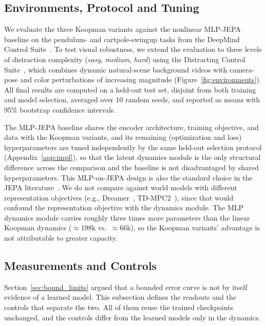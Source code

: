 \documentclass[10pt]{article} %
\begin{document}
\subsection{Environments, Protocol and Tuning}
\label{sec:protocol}
We evaluate the three Koopman variants against the nonlinear MLP-JEPA baseline on the pendulum- and cartpole-swingup tasks from the DeepMind Control Suite~\citep{Tassa2018}. To test visual robustness, we extend the evaluation to three levels of distraction complexity (\textit{easy}, \textit{medium}, \textit{hard}) using the Distracting Control Suite~\citep{Stone2021}, which combines dynamic natural-scene background videos with camera-pose and color perturbations of increasing magnitude (Figure~\ref{fig:environments}). All final results are computed on a held-out test set, disjoint from both training and model selection, averaged over 10 random seeds, and reported as means with 95\% bootstrap confidence intervals.

The MLP-JEPA baseline shares the encoder architecture, training objective, and data with the Koopman variants, and its remaining (optimization and loss) hyperparameters are tuned independently by the same held-out selection protocol (Appendix~\ref{app:impl}), so that the latent dynamics module is the only structural difference across the comparison and the baseline is not disadvantaged by shared hyperparameters. This MLP-on-JEPA design is also the standard choice in the JEPA literature~\citep{Bardes2024,zhou2025dinowmworldmodelspretrained}. We do not compare against world models with different representation objectives (e.g., Dreamer~\citep{Hafner2025}, TD-MPC2~\citep{Hansen2023}), since that would confound the representation objective with the dynamics module. The MLP dynamics module carries roughly three times more parameters than the linear Koopman dynamics ($\approx\!198$k vs.\ $\approx\!66$k), so the Koopman variants' advantage is not attributable to greater capacity.


\subsection{Measurements and Controls}
\label{sec:measurements}
Section~\ref{sec:bound_limits} argued that a bounded error curve is not by itself evidence of a learned model. This subsection defines the readouts and the controls that separate the two. All of them reuse the trained checkpoints unchanged, and the controls differ from the learned models only in the dynamics.
\end{document}

